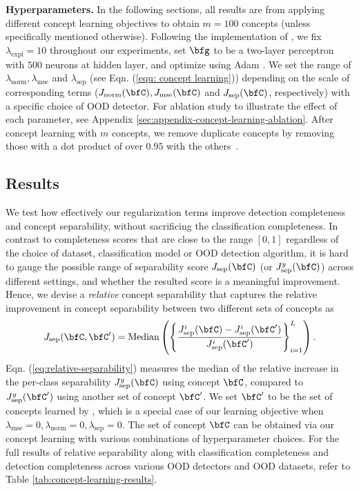 \textbf{Hyperparameters.}
In the following sections, all results are from applying different concept learning objectives to obtain $m = 100$ concepts (unless specifically mentioned otherwise). 
Following the implementation of \cite{yeh2019completeness}, we fix $\lambda_{\textrm{expl}} = 10$ throughout our experiments, set $\bfg$ to be a two-layer perceptron with $500$ neurons at hidden layer, and optimize using Adam \cite{kingma2014adam}.
We set the range of $\lambda_{\textrm{norm}}, \lambda_{\textrm{mse}}$ and $\lambda_{\textrm{sep}}$ (see Eqn. (\ref{equ: concept learning})) depending on the scale of corresponding terms (\ie $J_{\textrm{norm}}(\bfC),  J_{\textrm{mse}}(\bfC)$ and $ J_{\textrm{sep}}(\bfC)$, respectively) with a specific choice of OOD detector.
For ablation study to illustrate the effect of each parameter, see Appendix \ref{sec:appendix-concept-learning-ablation}.
After concept learning with $m$ concepts, we remove duplicate concepts by removing those with a dot product of over $0.95$ with the others~\cite{yeh2019completeness}.

\subsection{Results}\label{subsec:results}
We test how effectively our regularization terms improve detection completeness and concept separability, without sacrificing the classification completeness.
In contrast to completeness scores that are close to the range $[0, 1]$ regardless of the choice of dataset, classification model or OOD detection algorithm, it is hard to gauge the possible range of separability score $J_{\textrm{sep}}(\bfC)$ (or $J^y_{\textrm{sep}}(\bfC)$) across different settings, and whether the resulted score is a meaningful improvement.
Hence, we devise a \textit{relative} concept separability that captures the relative improvement in concept separability between two different sets of concepts as
\begin{equation}
\label{eq:relative-separability}
J_{\textrm{sep}}(\bfC, \bfC') = \textrm{Median}\left(\left\{\frac{J^i_{\textrm{sep}}(\bfC) - J^i_{\textrm{sep}}(\bfC')}{J^i_{\textrm{sep}}(\bfC')}\right\}_{i=1}^L\right).   
\end{equation}
Eqn. (\ref{eq:relative-separability}) measures the median of the relative increase in the per-class separability $J^y_{\textrm{sep}}(\bfC)$ using concept $\bfC$, compared to $J^y_{\textrm{sep}}(\bfC')$ using another set of concept $\bfC'$.
We set $\bfC'$ to be the set of concepts learned by \cite{yeh2019completeness}, which is a special case of our learning objective when $\lambda_\textrm{mse} = 0, \lambda_\textrm{norm} = 0, \lambda_\textrm{sep} = 0$.
The set of concept $\bfC$ can be obtained via our concept learning with various combinations of hyperparameter choices.
For the full results of relative separability along with classification completeness and detection completeness across various OOD detectors and OOD datasets, refer to Table \ref{tab:concept-learning-results}.

